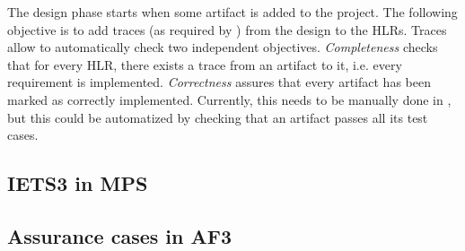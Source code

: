 The design phase starts when some artifact is added to the project.
The following objective is to add traces (as required by \doone) from the design to the HLRs.
Traces allow to automatically check two independent objectives.
\emph{Completeness} checks that for every HLR, there exists a trace from an artifact to it, i.e. every requirement is implemented.
\emph{Correctness} assures that every artifact has been marked as correctly implemented.
Currently, this needs to be manually done in \afthree, but this could be automatized by checking that an artifact passes all its test cases.

\subsection{IETS3 in MPS}
\label{sec:meta}


\subsection{Assurance cases in AF3}
